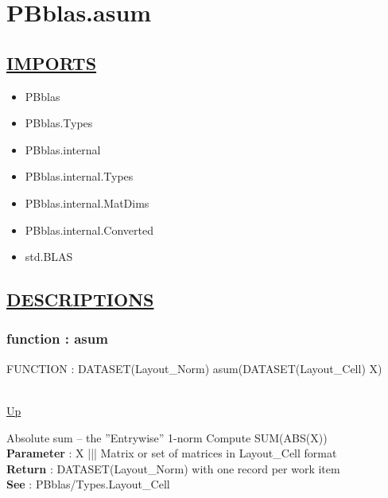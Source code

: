 \chapter*{PBblas.asum}
\hypertarget{PBblas.asum}{}

\section*{\underline{IMPORTS}}
\begin{itemize}
\item PBblas
\item PBblas.Types
\item PBblas.internal
\item PBblas.internal.Types
\item PBblas.internal.MatDims
\item PBblas.internal.Converted
\item std.BLAS
\end{itemize}

\section*{\underline{DESCRIPTIONS}}
\subsection*{function : asum}
\hypertarget{ecldoc:pbblas.asum}{FUNCTION : DATASET(Layout\_Norm) asum(DATASET(Layout\_Cell) X)} \\
\hyperlink{ecldoc:}{Up} \\
\par
Absolute sum -- the ''Entrywise'' 1-norm Compute SUM(ABS(X)) \\
\textbf{Parameter} : X ||| Matrix or set of matrices in Layout\_Cell format \\
\textbf{Return} : DATASET(Layout\_Norm) with one record per work item \\
\textbf{See} : PBblas/Types.Layout\_Cell \\
